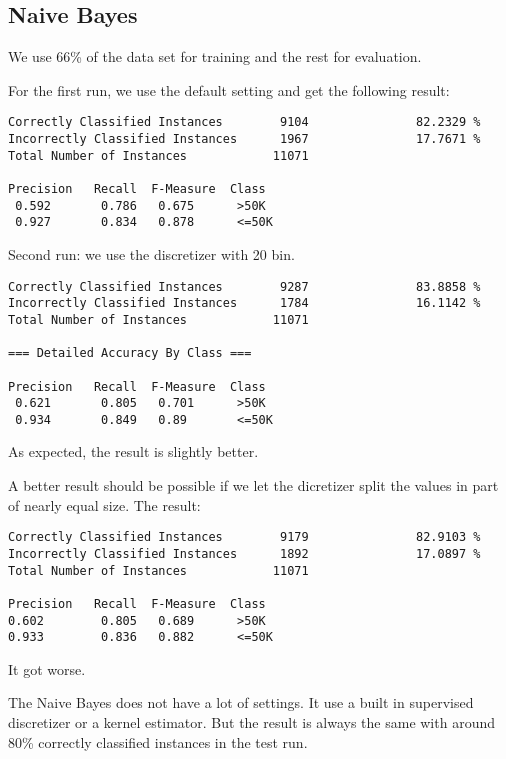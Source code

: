 \documentclass[paper=a4, fontsize=11pt]{scrartcl} %
\numberwithin{equation}{section} %
\numberwithin{figure}{section} %
\numberwithin{table}{section} %
\begin{document}
\subsection{Naive Bayes}

We use 66\% of the data set for training and the rest for evaluation.

For the first run, we use the default setting and get the following result:

\begin{verbatim}
Correctly Classified Instances        9104               82.2329 %
Incorrectly Classified Instances      1967               17.7671 %
Total Number of Instances            11071     

Precision   Recall  F-Measure  Class
 0.592       0.786   0.675      >50K
 0.927       0.834   0.878      <=50K
\end{verbatim}

Second run: we use the discretizer with 20 bin.

\begin{verbatim}
Correctly Classified Instances        9287               83.8858 %
Incorrectly Classified Instances      1784               16.1142 %
Total Number of Instances            11071     

=== Detailed Accuracy By Class ===

Precision   Recall  F-Measure  Class
 0.621       0.805   0.701      >50K
 0.934       0.849   0.89       <=50K
\end{verbatim}

As expected, the result is slightly better.

A better result should be possible if we let the dicretizer split the values in part of nearly equal size. The result:

\begin{verbatim}
Correctly Classified Instances        9179               82.9103 %
Incorrectly Classified Instances      1892               17.0897 %
Total Number of Instances            11071     

Precision   Recall  F-Measure  Class
0.602        0.805   0.689      >50K
0.933        0.836   0.882      <=50K
\end{verbatim}

It got worse. 

The Naive Bayes does not have a lot of settings. It use a built in supervised discretizer or a kernel estimator. But the result is always the same with around 80\% correctly classified instances in the test run.
\end{document}
